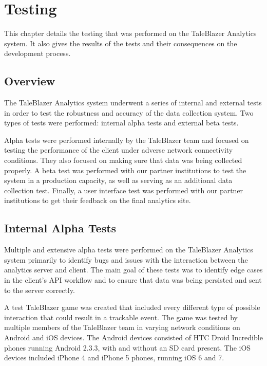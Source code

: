 \chapter{Testing}

This chapter details the testing that was performed on the TaleBlazer Analytics system. It also gives the results of the tests and their consequences on the development process. 

\section{Overview}

The TaleBlazer Analytics system underwent a series of internal and external tests in order to test the robustness and accuracy of the data collection system. Two types of tests were performed: internal alpha tests and external beta tests. 

Alpha tests were performed internally by the TaleBlazer team and focused on testing the performance of the client under adverse network connectivity conditions. They also focused on making sure that data was being collected properly. A beta test was performed with our partner institutions to test the system in a production capacity, as well as serving as an additional data collection test. Finally, a user interface test was performed with our partner institutions to get their feedback on the final analytics site.

\section{Internal Alpha Tests}

Multiple and extensive alpha tests were performed on the TaleBlazer Analytics system primarily to identify bugs and issues with the interaction between the analytics server and client. The main goal of these tests was to identify edge cases in the client's API workflow and to ensure that data was being persisted and sent to the server correctly.

A test TaleBlazer game was created that included every different type of possible interaction that could result in a trackable event. The game was tested by multiple members of the TaleBlazer team in varying network conditions on Android and iOS devices. The Android devices consisted of HTC Droid Incredible phones running Android 2.3.3, with and without an SD card present. The iOS devices included iPhone 4 and iPhone 5 phones, running iOS 6 and 7. 

